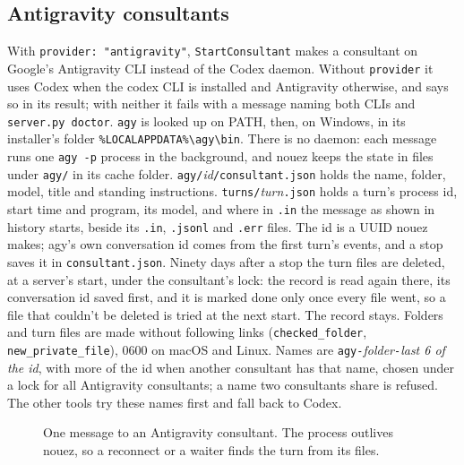 \documentclass[10pt,a4paper]{article}
\newcommand{\lifelines}[2]{%
  \foreach \x/\name/\col in {#1} {%
    \node[actor, draw=\col, text=\col] at (\x,0) {\name};
    \draw[lifeline] (\x,-0.4) -- (\x,-#2);
  }}
\newcommand{\msg}[4]{\draw[call] (#2,-#1) -- node[above=1pt,lbl]{#4} (#3,-#1);}
\newcommand{\ret}[4]{\draw[reply] (#2,-#1) -- node[above=1pt,lbl]{#4} (#3,-#1);}
\newcommand{\code}[1]{\texttt{#1}}
\begin{document}
\subsection{Antigravity consultants}
\label{sec:agy}

With \code{provider: "antigravity"}, \code{StartConsultant} makes a consultant on Google's
Antigravity CLI instead of the Codex daemon. Without \code{provider} it uses Codex when the codex
CLI is installed and Antigravity otherwise, and says so in its result; with neither it fails with
a message naming both CLIs and \code{server.py doctor}. \code{agy} is looked up on PATH, then, on
Windows, in its installer's folder \code{\%LOCALAPPDATA\%\textbackslash agy\textbackslash bin}. There is no daemon: each message runs one
\code{agy -p} process in the background, and nouez keeps the state in files under
\code{agy/} in its cache folder. \code{agy/}\textit{id}\code{/consultant.json} holds the name,
folder, model, title and standing instructions. \code{turns/}\textit{turn}\code{.json} holds a
turn's process id, start time and program, its model, and where in \code{.in} the message as
shown in history starts, beside its \code{.in}, \code{.jsonl} and \code{.err} files. The id is a
UUID nouez makes; agy's own conversation id comes from the first turn's events, and a stop
saves it in \code{consultant.json}. Ninety days after a stop the turn files are deleted, at a
server's start, under the consultant's lock: the record is read again there, its conversation id
saved first, and it is marked done only once every file went, so a file that couldn't be deleted
is tried at the next start. The record stays. Folders and turn files are made
without following links (\code{checked\_folder}, \code{new\_private\_file}), 0600 on macOS and Linux. Names are
\code{agy-}\textit{folder}\code{-}\textit{last 6 of the id}, with more of the id when another
consultant has that name, chosen under a lock for all Antigravity consultants; a name two
consultants share is refused. The other tools try these
names first and fall back to Codex.

\begin{figure}[H]
\centering
{}
\caption{One message to an Antigravity consultant. The process outlives nouez, so a reconnect or
a waiter finds the turn from its files.}
\end{figure}
\end{document}
